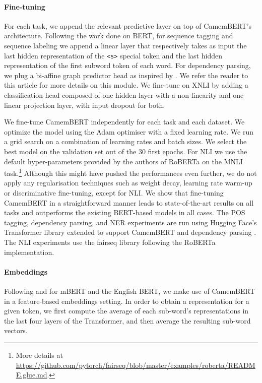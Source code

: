 \documentclass[11pt,a4paper]{article}
\newcommand{\camembert}{CamemBERT\xspace}
\newcommand{\roberta}{RoBERTa\xspace}
\newcommand{\bert}{BERT\xspace}
\newcommand{\mbert}{mBERT\xspace}
\begin{document}
\paragraph{Fine-tuning}
For each task, we append the relevant predictive layer on top of \camembert's  architecture. Following the work done on \bert \cite{devlin2019bert}, for sequence tagging and sequence labeling we append a linear layer that respectively takes as input the last hidden representation of the \texttt{<s>} special token and the last hidden representation of the first subword token of each word.
For dependency parsing, we plug a bi-affine graph predictor head as inspired by \citet{dozat2017deep}. We refer the reader to this article for more details on this module.
We fine-tune on XNLI by adding a classification head composed of one hidden layer with a non-linearity and one linear projection layer, with input dropout for both.

We fine-tune \camembert independently for each task and each dataset. We optimize the model using the Adam optimiser \cite{kingma2014adam} with a fixed learning rate. We run a grid search on a combination of learning rates and batch sizes. We select the best model on the validation set out of the 30 first epochs.
For NLI we use the default hyper-parameters provided by the authors of RoBERTa on the MNLI task.\footnote{More details at \url{https://github.com/pytorch/fairseq/blob/master/examples/roberta/README.glue.md}.}
Although this might have pushed the performances even further, we do not apply any regularisation techniques such as weight decay, learning rate warm-up or discriminative fine-tuning, except for NLI. We show that fine-tuning \camembert in a straightforward manner leads to state-of-the-art results on all tasks and outperforms the existing \bert-based models in all cases. 
The POS tagging, dependency parsing, and NER experiments are run using Hugging Face's Transformer library extended to support \camembert and dependency parsing \cite{Wolf2019HuggingFacesTS}. 
The NLI experiments use the fairseq library following the \roberta implementation.


\paragraph{Embeddings}

Following \citet{strakova2019neural} and \citet{straka2019evaluating} for \mbert and the English BERT, we make use of \camembert in a feature-based embeddings setting.
In order to obtain a representation for a given token, we first compute the average of each sub-word’s representations in the last four layers of the Transformer, and then average the resulting sub-word vectors.
\end{document}
